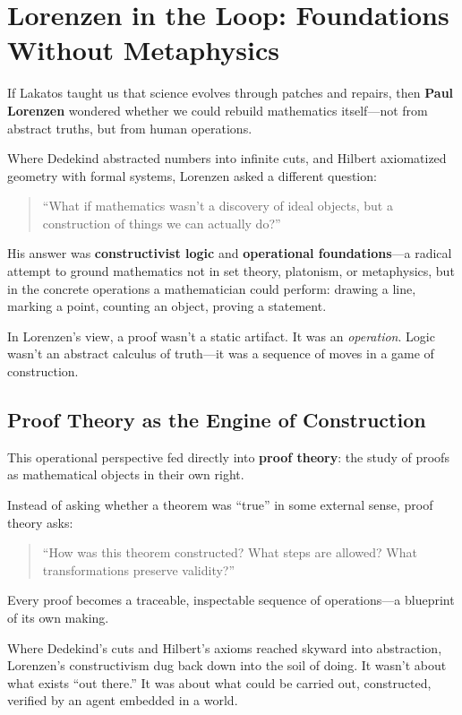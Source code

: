 \section{Lorenzen in the Loop: Foundations Without Metaphysics}

If Lakatos taught us that science evolves through patches and repairs, then \textbf{Paul Lorenzen} wondered whether we could rebuild mathematics itself—not from abstract truths, but from human operations.

Where Dedekind abstracted numbers into infinite cuts, and Hilbert axiomatized geometry with formal systems, Lorenzen asked a different question:

\begin{quote}
    “What if mathematics wasn’t a discovery of ideal objects, but a construction of things we can actually do?”
\end{quote}

His answer was \textbf{constructivist logic} and \textbf{operational foundations}—a radical attempt to ground mathematics not in set theory, platonism, or metaphysics, but in the concrete operations a mathematician could perform: drawing a line, marking a point, counting an object, proving a statement.

In Lorenzen’s view, a proof wasn’t a static artifact. It was an \emph{operation}. Logic wasn’t an abstract calculus of truth—it was a sequence of moves in a game of construction.

\vspace{1em}

\subsection{Proof Theory as the Engine of Construction}

This operational perspective fed directly into \textbf{proof theory}: the study of proofs as mathematical objects in their own right.

Instead of asking whether a theorem was “true” in some external sense, proof theory asks:

\begin{quote}
    “How was this theorem constructed? What steps are allowed? What transformations preserve validity?”
\end{quote}

Every proof becomes a traceable, inspectable sequence of operations—a blueprint of its own making.

Where Dedekind’s cuts and Hilbert’s axioms reached skyward into abstraction, Lorenzen’s constructivism dug back down into the soil of doing. It wasn’t about what exists “out there.” It was about what could be carried out, constructed, verified by an agent embedded in a world.

